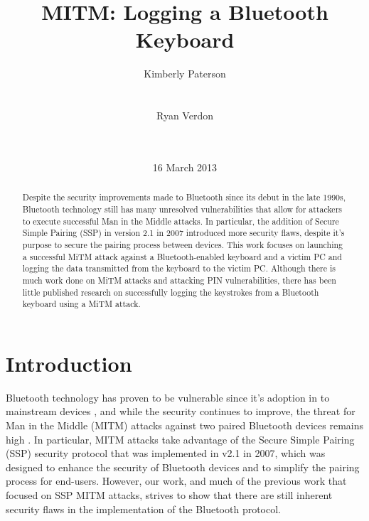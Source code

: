 \documentclass{acm_proc_article-sp}
\begin{document}
\title{MITM: Logging a Bluetooth Keyboard}
\author{
\alignauthor Kimberly Paterson\\
\\
\\
\alignauthor Ryan Verdon\\
\\
\\
}

\date{16 March 2013}
\maketitle

\begin{abstract}
Despite the security improvements made to Bluetooth since its debut in the late 1990s, Bluetooth technology still has many unresolved vulnerabilities that allow for attackers to execute successful Man in the Middle attacks. In particular, the addition of Secure Simple Pairing (SSP) in version 2.1 in 2007 introduced more security flaws, despite it's purpose to secure the pairing process between devices. This work focuses on launching a successful MiTM attack against a Bluetooth-enabled keyboard and a victim PC and logging the data transmitted from the keyboard to the victim PC. Although there is much work done on MiTM attacks and attacking PIN vulnerabilities, there has been little published research on successfully logging the keystrokes from a Bluetooth keyboard using a MiTM attack. 
\end{abstract}



\section{Introduction}
Bluetooth technology has proven to be vulnerable since it's adoption in to mainstream devices \cite{scarfone2008guide}, and while the security continues to improve, the threat for Man in the Middle (MITM) attacks against two paired Bluetooth devices remains high \cite{sandhya2012analysis}. In particular, MITM attacks take advantage of the Secure Simple Pairing (SSP) security protocol that was implemented in v2.1 in 2007, which was designed to enhance the security of Bluetooth devices and to simplify the pairing process for end-users. However, our work, and much of the previous work that focused on SSP MITM attacks, strives to show that there are still inherent security flaws in the implementation of the Bluetooth protocol. 
\end{document}
